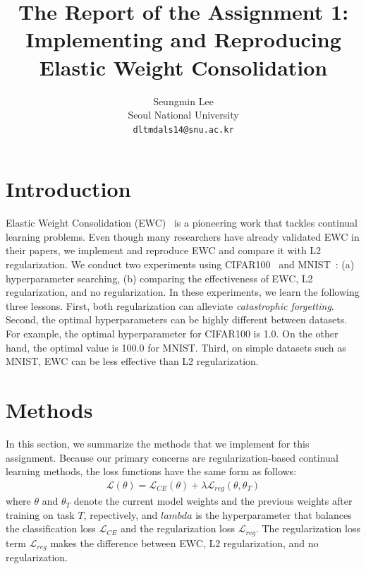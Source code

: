 \documentclass[final]{cvpr}
\begin{document}
\title{The Report of the Assignment 1:\\Implementing and Reproducing Elastic Weight Consolidation}

\author{Seungmin Lee\\
Seoul National University\\
{\tt\small dltmdals14@snu.ac.kr}
}

\onecolumn
\maketitle


\section{Introduction}
Elastic Weight Consolidation (EWC)~\cite{ewc} is a pioneering work that tackles continual learning problems. Even though many researchers have already validated EWC in their papers, we implement and reproduce EWC and compare it with L2 regularization. We conduct two experiments using CIFAR100~\cite{cifar} and MNIST~\cite{mnist}: (a) hyperparameter searching, (b) comparing the effectiveness of EWC, L2 regularization, and no regularization. In these experiments, we learn the following three lessons. First, both regularization can alleviate \textit{catastrophic forgetting}. Second, the optimal hyperparameters can be highly different between datasets. For example, the optimal hyperparameter for CIFAR100 is 1.0. On the other hand, the optimal value is 100.0 for MNIST. Third, on simple datasets such as MNIST, EWC can be less effective than L2 regularization. 

\section{Methods}\label{method}
In this section, we summarize the methods that we implement for this assignment. Because our primary concerns are regularization-based continual learning methods, the loss functions have the same form as follows:
\begin{align}
	\mathcal{L}(\theta) = \mathcal{L}_{CE}(\theta) + \lambda\mathcal{L}_{reg}(\theta, \theta_T)
\end{align}
where $\theta$ and $\theta_T$ denote the current model weights and the previous weights after training on task $T$, repectively, and $lambda$ is the hyperparameter that balances the classification loss $\mathcal{L}_{CE}$ and the regularization loss $\mathcal{L}_{reg}$. The regularization loss term $\mathcal{L}_{reg}$ makes the difference between EWC, L2 regularization, and no regularization.
\end{document}
